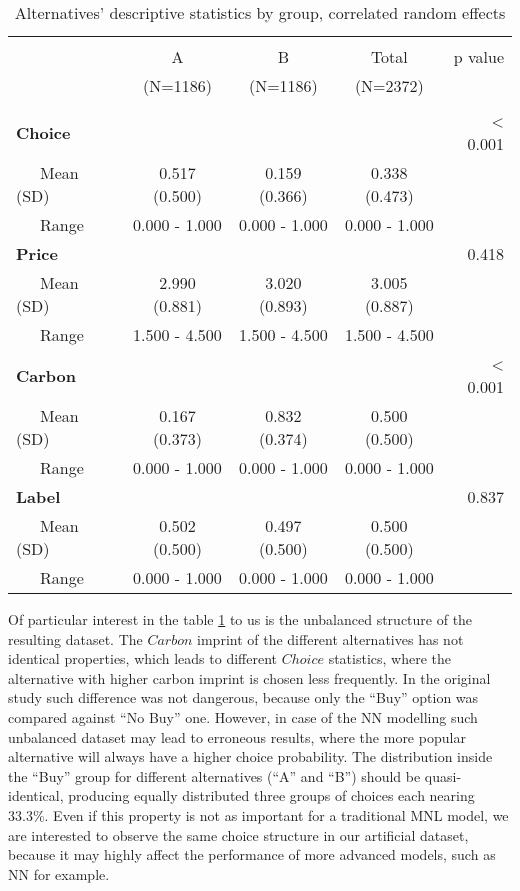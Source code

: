 \documentclass[11pt,]{article}
\begin{document}
\begin{table}[!htbp] \centering 
  \caption{Alternatives' descriptive statistics by group, correlated random effects} 
  \label{tab:altdata} 
\begin{tabular}{@{\extracolsep{5pt}}lcccr}
\\[-1.8ex]\hline 
\hline \\[-1.8ex] 
 & A  & B  & Total  & p value\\
 & (N=1186) & (N=1186) & (N=2372) &  \\
\hline \\[-1.8ex] 
\textbf{Choice} &  &  &  & < 0.001\\
~~~Mean (SD) & 0.517 (0.500) & 0.159 (0.366) & 0.338 (0.473) & \\
~~~Range & 0.000 - 1.000 & 0.000 - 1.000 & 0.000 - 1.000 & \\
\textbf{Price} &  &  &  & 0.418\\
~~~Mean (SD) & 2.990 (0.881) & 3.020 (0.893) & 3.005 (0.887) & \\
~~~Range & 1.500 - 4.500 & 1.500 - 4.500 & 1.500 - 4.500 & \\
\textbf{Carbon} &  &  &  & < 0.001\\
~~~Mean (SD) & 0.167 (0.373) & 0.832 (0.374) & 0.500 (0.500) & \\
~~~Range & 0.000 - 1.000 & 0.000 - 1.000 & 0.000 - 1.000 & \\
\textbf{Label} &  &  &  & 0.837\\
~~~Mean (SD) & 0.502 (0.500) & 0.497 (0.500) & 0.500 (0.500) & \\
~~~Range & 0.000 - 1.000 & 0.000 - 1.000 & 0.000 - 1.000 & \\
\hline
\end{tabular}
\end{table}

Of particular interest in the table \ref{tab:altdata} to us is the
unbalanced structure of the resulting dataset. The \(Carbon\) imprint of
the different alternatives has not identical properties, which leads to
different \(Choice\) statistics, where the alternative with higher
carbon imprint is chosen less frequently. In the original study such
difference was not dangerous, because only the ``Buy'' option was
compared against ``No Buy'' one. However, in case of the NN modelling
such unbalanced dataset may lead to erroneous results, where the more
popular alternative will always have a higher choice probability. The
distribution inside the ``Buy'' group for different alternatives (``A''
and ``B'') should be quasi-identical, producing equally distributed
three groups of choices each nearing 33.3\%. Even if this property is
not as important for a traditional MNL model, we are interested to
observe the same choice structure in our artificial dataset, because it
may highly affect the performance of more advanced models, such as NN
for example.
\end{document}
